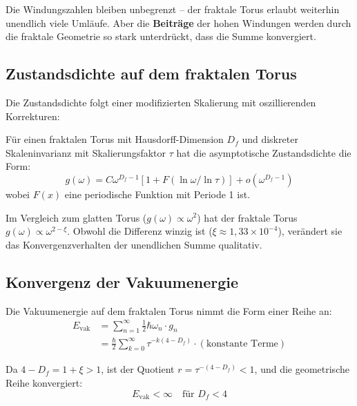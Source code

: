 	Die Windungszahlen bleiben unbegrenzt -- der fraktale Torus erlaubt weiterhin unendlich viele Umläufe. Aber die \textbf{Beiträge} der hohen Windungen werden durch die fraktale Geometrie so stark unterdrückt, dass die Summe konvergiert.
	
	\subsection{Zustandsdichte auf dem fraktalen Torus}
	
	Die Zustandsdichte folgt einer modifizierten Skalierung mit oszillierenden Korrekturen:
	
	\begin{keypoint}
		Für einen fraktalen Torus mit Hausdorff-Dimension $D_f$ und diskreter Skaleninvarianz mit Skalierungsfaktor $\tau$ hat die asymptotische Zustandsdichte die Form:
		\begin{equation}
			g(\omega) = C \omega^{D_f-1} \left[ 1 + F(\ln \omega / \ln \tau) \right] + o(\omega^{D_f-1})
			\label{eq:dos-fractal}
		\end{equation}
		wobei $F(x)$ eine periodische Funktion mit Periode 1 ist.
	\end{keypoint}
	
	Im Vergleich zum glatten Torus ($g(\omega) \propto \omega^2$) hat der fraktale Torus $g(\omega) \propto \omega^{2-\xi}$. Obwohl die Differenz winzig ist ($\xi \approx 1{,}33 \times 10^{-4}$), verändert sie das Konvergenzverhalten der unendlichen Summe qualitativ.
	
	\subsection{Konvergenz der Vakuumenergie}
	
	Die Vakuumenergie auf dem fraktalen Torus nimmt die Form einer Reihe an:
	\begin{align}
		E_{\text{vak}} &= \sum_{n=1}^{\infty} \frac{1}{2} \hbar \omega_n \cdot g_n \\
		&= \frac{\hbar}{2} \sum_{k=0}^{\infty} \tau^{-k(4-D_f)} \cdot (\text{konstante Terme})
	\end{align}
	
	Da $4 - D_f = 1 + \xi > 1$, ist der Quotient $r = \tau^{-(4-D_f)} < 1$, und die geometrische Reihe konvergiert:
	\begin{equation}
		E_{\text{vak}} < \infty \quad \text{für } D_f < 4
	\end{equation}
	

